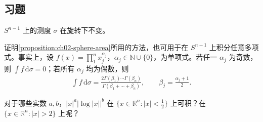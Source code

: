 \documentclass[../../main.tex]{subfiles}%
\begin{document}
\subsection*{习题}
\begin{exercise}\label{exercise:ch02-surface-rotation}
$S^{n-1}$ 上的测度 $\sigma$ 在旋转下不变。
\end{exercise}
\begin{exercise}\label{exercise:ch02-spherical-monomials}
证明\cref{proposition:ch02-sphere-area}所用的方法，也可用于在 $S^{n-1}$ 上积分任意多项式。事实上，设 $f(x)=\prod_1^n x_j^{\alpha_j}$，$\alpha_j\in\mathbb{N}\cup\{0\}$，为单项式。若任一 $\alpha_j$ 为奇数，则 $\int f\,\mathrm{d}\sigma=0$；若所有 $\alpha_j$ 均为偶数，则
\begin{align*}
\int f\,\mathrm{d}\sigma=\frac{2\Gamma(\beta_1)\cdots\Gamma(\beta_n)}{\Gamma(\beta_1+\cdots+\beta_n)},
\qquad\beta_j=\frac{\alpha_j+1}{2}.
\end{align*}
\end{exercise}
\begin{exercise}\label{exercise:ch02-power-log-integrability}
对于哪些实数 $a,b$，$|x|^a|\log|x||^b$ 在 $\{x\in\mathbb{R}^n:|x|<\frac12\}$ 上可积？在 $\{x\in\mathbb{R}^n:|x|>2\}$ 上呢？
\end{exercise}
\end{document}
